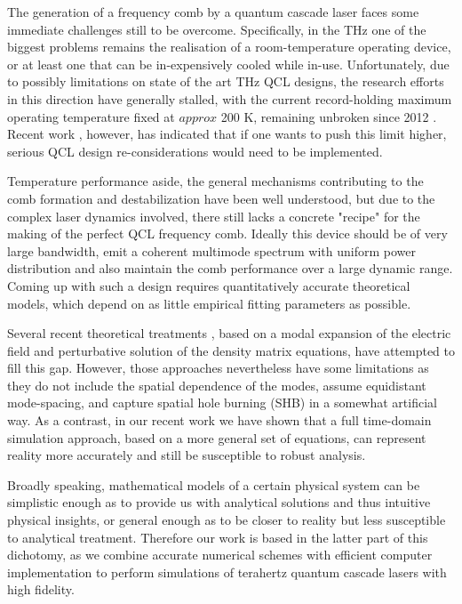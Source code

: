 \documentclass[journal]{IEEEtran}
\begin{document}
The generation of a frequency comb by a quantum cascade laser faces some immediate challenges still to be overcome. Specifically, in the THz one of the biggest problems remains the realisation of a room-temperature operating device, or at least one that can be in-expensively cooled while in-use. Unfortunately, due to possibly limitations \cite{albo2015investigating} on state of the art THz QCL designs, the research efforts in this direction have generally stalled, with the current record-holding maximum operating temperature fixed at $approx$ 200 K, remaining unbroken since 2012 \cite{fathololoumi2012terahertz}. Recent work \cite{albo2017temperature}, however, has indicated that if one wants to push this limit higher, serious QCL design re-considerations would need to be implemented.

Temperature performance aside, the general mechanisms contributing to the comb formation and destabilization have been well understood, but due to the complex laser dynamics involved, there still lacks a concrete "recipe" for the making of the perfect QCL frequency comb. Ideally this device should be of very large bandwidth, emit a coherent multimode spectrum with uniform power distribution and also maintain the comb performance over a large dynamic range. Coming up with such a design requires
 quantitatively accurate theoretical models, which depend on as little empirical fitting parameters as possible.

Several recent theoretical treatments \cite{khurgin2014coherent,villares2015quantum}, based on a modal expansion of the electric field and perturbative solution of the density matrix equations, have attempted to fill this gap. However, those approaches nevertheless have some limitations as they do not include the spatial dependence of the modes, assume equidistant mode-spacing, and capture spatial hole burning (SHB) in a somewhat artificial way. As a contrast, in our recent work \cite{petz2016} we have shown that a full time-domain simulation approach, based on a more general set of equations, can represent reality more accurately and still be susceptible to robust analysis.

Broadly speaking, mathematical models of a certain physical system can be simplistic enough as to provide us with analytical solutions and thus intuitive physical insights, or general enough as to be closer to reality but less susceptible to analytical treatment. Therefore our work is based in the latter part of this dichotomy, as we combine accurate numerical schemes with efficient computer implementation to perform simulations of terahertz quantum cascade lasers with high fidelity.
\end{document}
